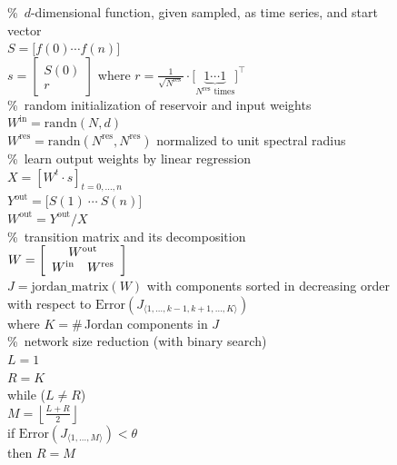 \documentclass[twoside,11pt]{article}
\theoremstyle{definition}
\begin{document}
\begin{figure}
\newcommand{\commt}[1]{\%~#1\\}%
\begin{algorithmic}[1]\State
	\commt{$d$-dimensional function, given sampled, as time series, and start vector}
	$S = \big[ f(0) \cdots f(n) \big]$\\
	$s = \left[ \begin{array}{c} S(0) \\ r \end{array} \right]$ where
		$r = \frac{1}{\sqrt{N^\mathrm{res}}} \cdot
		\big[ \underbrace{1 \cdots 1}_{N^\mathrm{res} \text{~times}} \big]^\top$\newline
	\\
	\commt{random initialization of reservoir and input weights}
	$W^\mathrm{in} = \mathrm{randn}(N,d)$\\
	$W^\mathrm{res} = \mathrm{randn}(N^\mathrm{res},N^\mathrm{res})$
		normalized to unit spectral radius\newline
	\\
	\commt{learn output weights by linear regression}
	$X = \left[W^t \cdot s\right]_{t=0,\dots,n}$\\
	$Y^\mathrm{out} = \big[ S(1)\ \cdots\ S(n) \big]$\\
	$W^\mathrm{out} = Y^\mathrm{out}/X$\newline
	\\
	\commt{transition matrix and its decomposition}
	$W = \left[ \begin{array}{cc}
		\multicolumn{2}{c}{W^\mathrm{out}}\\
		W^\mathrm{in} & W^\mathrm{res}
	\end{array} \right]$\\
	$J = \mathrm{jordan\_matrix}(W)$ with components sorted in decreasing order\\
	\quad with respect to $\mathrm{Error}(J_{\langle 1,\dots,k-1,k+1,\dots,K \rangle})$\\
	\quad where $K = \#$\,Jordan components in $J$\newline
	\\
	\commt{network size reduction (with binary search)}
	$L = 1$\\
	$R = K$\\
	while ($L \neq R$)\\
	\quad $M = \left\lfloor\frac{L+R}{2}\right\rfloor$\\
	\quad if $\mathrm{Error}(J_{\langle 1,\dots,M \rangle}) < \theta$\\
	\qquad then $R = M$\\

\end{algorithmic}
\end{figure}
\end{document}
